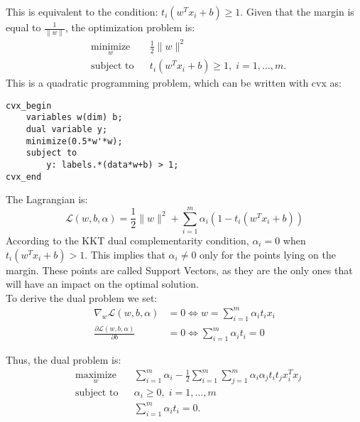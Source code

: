This is equivalent to the condition: $ t_i(w^Tx_i+b) \geq 1$.
Given that the margin is equal to $\frac{1}{\|w\|}$, the optimization problem is:
\begin{equation*}
\begin{aligned}
& \underset{w}{\text{minimize}}
& & \frac{1}{2}\|w\|^2 \\
& \text{subject to}
& & t_i(w^Tx_i+b) \geq 1, \; i = 1, \ldots, m.
\end{aligned}
\end{equation*}
This is a quadratic programming problem, which can be written with cvx as:
\begin{verbatim}
cvx_begin
    variables w(dim) b; 
    dual variable y;
    minimize(0.5*w'*w);
    subject to 
  	    y: labels.*(data*w+b) > 1; 
cvx_end
\end{verbatim}
The Lagrangian is: \[ \mathcal{L}(w,b,\alpha)= \frac{1}{2} \|w\|^2+\sum\limits_{i=1}^m \alpha_i (1-t_i(w^Tx_i+b))\]
According to the KKT dual complementarity condition, $\alpha_i = 0$ when $t_i(w^Tx_i+b) > 1$. This implies that  $\alpha_i \neq 0$ only for the points lying on the margin. These points are called Support Vectors, as they are the only ones that will have an impact on the optimal solution.\\
To derive the dual problem we set:
\begin{equation*}
\begin{aligned}
 \nabla _w \mathcal{L}(w,b,\alpha)&=0 \Leftrightarrow w=\sum\limits_{i=1}^m \alpha_i t_i x_i\\
\frac{ \partial \mathcal{L}(w,b,\alpha)}{\partial b}&=0 \Leftrightarrow  \sum\limits_{i=1}^m \alpha_i t_i=0
\end{aligned}
\end{equation*}

Thus, the dual problem is:
\begin{equation*}
\begin{aligned}
& \underset{w}{\text{maximize}}
& & \sum\limits_{i=1}^m \alpha_i - \frac{1}{2} \sum\limits_{i=1}^m \sum\limits_{j=1}^m \alpha_i \alpha_j t_i t_j x_i^T x_j \\
& \text{subject to}
& & \alpha_i \geq 0, \; i = 1, \ldots, m \\
& & & \sum\limits_{i=1}^m \alpha_i t_i = 0.
\end{aligned}
\end{equation*}

